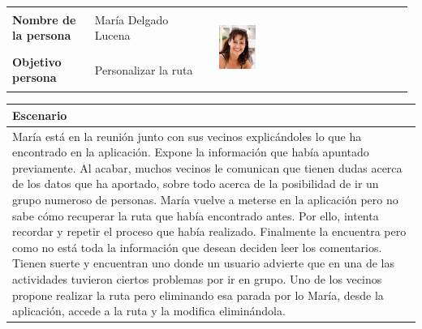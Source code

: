 \documentclass[11pt]{article}
\begin{document}
\begin{table}[H]
  \centering
  \begin{tabular}{p{0.2\linewidth}|p{0.3\linewidth}p{0.475\linewidth}}
    \toprule
    \textbf{Nombre de la persona} & María Delgado Lucena &\multirow{2}{*}{\begin{minipage}{1.\textwidth}\includegraphics[width=0.2\textwidth, height=25mm]{Maria}\end{minipage}}\\
    \textbf{Objetivo persona} & Personalizar la ruta & \\
    \bottomrule
  \end{tabular}

\begin{tabular}{p{1.028\linewidth}}
  \textbf{Escenario}\\
  \midrule
  María está en la reunión junto con sus vecinos explicándoles lo que ha encontrado en la aplicación. Expone la información que había apuntado previamente. Al acabar, muchos vecinos le comunican que tienen dudas acerca de los datos que ha aportado, sobre todo acerca de la posibilidad de ir un grupo numeroso de personas. María vuelve a meterse en la aplicación pero no sabe cómo recuperar la ruta que había encontrado antes. Por ello, intenta recordar y repetir el proceso que había realizado. Finalmente la encuentra pero como no está toda la información que desean deciden leer los comentarios. Tienen suerte y encuentran uno donde un usuario advierte que en una de las actividades tuvieron ciertos problemas por ir en grupo. Uno de los vecinos propone realizar la ruta pero eliminando esa parada por lo María, desde la aplicación, accede a la ruta y la modifica eliminándola.  
\end{tabular}
\end{table}
\end{document}
